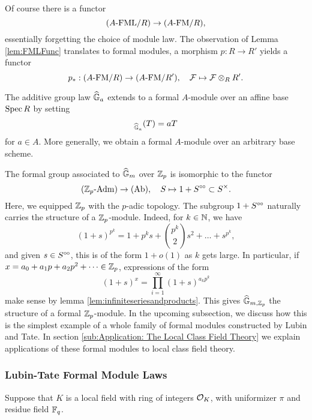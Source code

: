 Of course there is a functor 
\begin{equation*}
  {({A}\text-\mathrm{FML}/{R})} \to {({A}\text-\mathrm{FM}/{R})},
\end{equation*}
essentially forgetting the choice of module law. The observation of Lemma 
\ref{lem:FMLFunc} translates to formal modules, a morphism $p : R \to R'$ 
yields a functor 
\begin{equation*} p_*: {({A}\text-\mathrm{FM}/{R})} \to {({A}\text-\mathrm{FM}/{R'})}, \quad \mathcal{F} \mapsto \mathcal{F} \otimes_R R'.
\end{equation*}

\begin{xpl}
  The additive group law $\widehat{\mathbb{G}}_a$ extends to a formal $A$-module over an affine base
  $\operatorname{Spec} R$ by setting 
  \begin{equation*}
    [a]_{\GG_a}(T) = aT
  \end{equation*}
  for $a \in A$. More generally, we obtain a formal $A$-module over an arbitrary base
  scheme.

  The formal group associated to $\widehat{\mathbb{G}}_m$ over $\mathbb{Z}_p$ is isomorphic to the functor
  \begin{equation*}
    {({\mathbb{Z}_p}\text-\mathrm{Adm})} \to {(\mathrm{Ab})}, \quad S \mapsto 1 + S^{\circ \hspace{-0.5pt} \circ} \subset S^\times.
  \end{equation*}
  Here, we equipped $\mathbb{Z}_p$ with the $p$-adic topology.
  The subgroup $1 + S^{\circ \hspace{-0.5pt} \circ}$ naturally carries the structure of a $\mathbb{Z}_p$-module.
  Indeed, for $k \in \mathbb{N}$, we have
  \begin{equation*}
    (1+s)^{p^k} = 1 + p^ks + \binom{p^k}2 s^2 + \dots + s^{p^k},
  \end{equation*}
  and given $s \in S^{\circ \hspace{-0.5pt} \circ}$, this is of the form $1+ o(1)$ as $k$ gets large. 
  In particular, if $x = a_0 + a_1 p + a_2p^2 + \dots \in \mathbb{Z}_p$, expressions of the form
  \begin{equation*}
    (1+s)^x = \prod_{i = 1}^\infty (1+s)^{a_k p^k}
  \end{equation*}
  make sense by lemma \ref{lem:infiniteseriesandproducts}. This gives
  $\widehat{\mathbb{G}}_{m,\mathbb{Z}_p}$ the structure of a formal $\mathbb{Z}_p$-module. 
  In the upcoming subsection, we discuss how this is the simplest example of a
  whole family of formal modules constructed by 
  Lubin and Tate. In section \ref{sub:Application: The Local Class Field
  Theory} we explain applications of these formal modules to local class field
  theory.
\end{xpl}

\subsubsection{Lubin-Tate Formal Module Laws} %
\label{ssub:Lubin-Tate Formal Module Laws}
Suppose that $K$ is a local field with ring of integers $\mathcal{O}_K$, with uniformizer
$\pi$ and residue field $\mathbb{F}_q$. 

